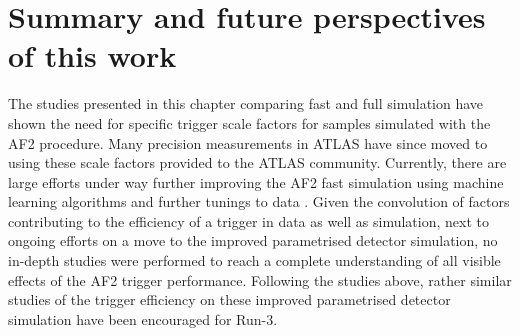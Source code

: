 \FloatBarrier
\section{Summary and future perspectives of this work}
\label{sec:trigg:perspectives}

The studies presented in this chapter comparing fast and full simulation have shown the need for specific trigger scale factors for samples simulated with the AF2 procedure.  Many precision measurements in ATLAS have since moved to using these scale factors provided to the ATLAS community. 
Currently,  there are large efforts under way further improving the AF2 fast simulation using machine learning algorithms and further tunings to data \cite{AF3}.  
Given the convolution of factors contributing to the efficiency of a trigger in data as well as simulation, next to ongoing efforts on a move to the improved parametrised detector simulation,  no in-depth studies were performed to reach a complete understanding of all visible effects of the AF2 trigger performance.
Following the studies above,  rather similar studies of the trigger efficiency on these improved parametrised detector simulation have been encouraged for Run-3. 
